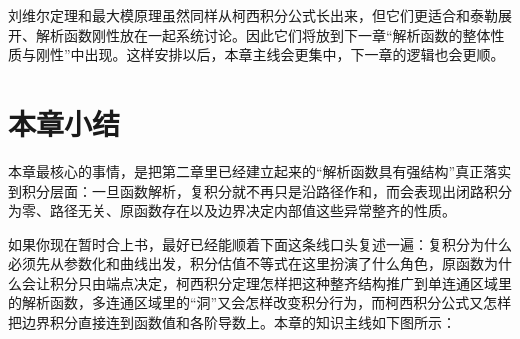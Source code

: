 \begin{tishi}[和下一章的衔接]
刘维尔定理和最大模原理虽然同样从柯西积分公式长出来，但它们更适合和泰勒展开、解析函数刚性放在一起系统讨论。因此它们将放到下一章``解析函数的整体性质与刚性''中出现。这样安排以后，本章主线会更集中，下一章的逻辑也会更顺。
\end{tishi}

\section{本章小结}

\begin{tishi}[一句话回看本章]
本章最核心的事情，是把第二章里已经建立起来的``解析函数具有强结构''真正落实到积分层面：一旦函数解析，复积分就不再只是沿路径作和，而会表现出闭路积分为零、路径无关、原函数存在以及边界决定内部值这些异常整齐的性质。
\end{tishi}

如果你现在暂时合上书，最好已经能顺着下面这条线口头复述一遍：复积分为什么必须先从参数化和曲线出发，积分估值不等式在这里扮演了什么角色，原函数为什么会让积分只由端点决定，柯西积分定理怎样把这种整齐结构推广到单连通区域里的解析函数，多连通区域里的``洞''又会怎样改变积分行为，而柯西积分公式又怎样把边界积分直接连到函数值和各阶导数上。本章的知识主线如下图所示：

